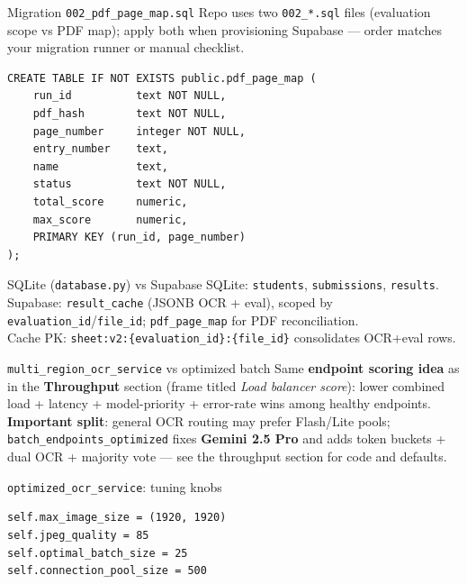 \documentclass[aspectratio=169]{beamer}
\begin{document}
\begin{frame}[fragile]{Migration \texttt{002\_pdf\_page\_map.sql}}
  \footnotesize Repo uses two \texttt{002\_*.sql} files (evaluation scope vs PDF map); apply both when provisioning Supabase --- order matches your migration runner or manual checklist.
\begin{lstlisting}[style=py]
CREATE TABLE IF NOT EXISTS public.pdf_page_map (
    run_id          text NOT NULL,
    pdf_hash        text NOT NULL,
    page_number     integer NOT NULL,
    entry_number    text,
    name            text,
    status          text NOT NULL,
    total_score     numeric,
    max_score       numeric,
    PRIMARY KEY (run_id, page_number)
);
\end{lstlisting}
\end{frame}

\begin{frame}{SQLite (\texttt{database.py}) vs Supabase}
  \footnotesize
  SQLite: \texttt{students}, \texttt{submissions}, \texttt{results}.\\
  Supabase: \texttt{result\_cache} (JSONB OCR + eval), scoped by \texttt{evaluation\_id}/\texttt{file\_id}; \texttt{pdf\_page\_map} for PDF reconciliation.\\
  Cache PK: \texttt{sheet:v2:\{evaluation\_id\}:\{file\_id\}} consolidates OCR+eval rows.
\end{frame}

\begin{frame}{\texttt{multi\_region\_ocr\_service} vs optimized batch}
  \small
  Same \textbf{endpoint scoring idea} as in the \textbf{Throughput} section (frame titled \textit{Load balancer score}): lower combined load + latency + model-priority + error-rate wins among healthy endpoints.\\
  \textbf{Important split}: general OCR routing may prefer Flash/Lite pools; \texttt{batch\_endpoints\_optimized} fixes \textbf{Gemini 2.5 Pro} and adds token buckets + dual OCR + majority vote --- see the throughput section for code and defaults.
\end{frame}

\begin{frame}[fragile]{\texttt{optimized\_ocr\_service}: tuning knobs}
\begin{lstlisting}[style=py]
self.max_image_size = (1920, 1920)
self.jpeg_quality = 85
self.optimal_batch_size = 25
self.connection_pool_size = 500
\end{lstlisting}
\end{frame}
\end{document}
